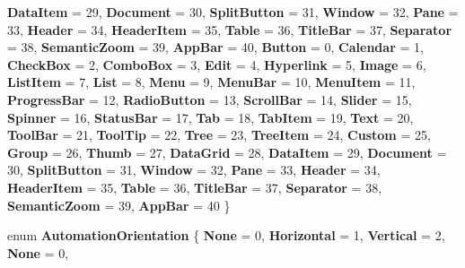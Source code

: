 \begin{DoxyCompactItemize}
{\bfseries Data\+Item} = 29, 
{\bfseries Document} = 30, 
{\bfseries Split\+Button} = 31, 
{\bfseries Window} = 32, 
\newline
{\bfseries Pane} = 33, 
{\bfseries Header} = 34, 
{\bfseries Header\+Item} = 35, 
{\bfseries Table} = 36, 
\newline
{\bfseries Title\+Bar} = 37, 
{\bfseries Separator} = 38, 
{\bfseries Semantic\+Zoom} = 39, 
{\bfseries App\+Bar} = 40, 
\newline
{\bfseries Button} = 0, 
{\bfseries Calendar} = 1, 
{\bfseries Check\+Box} = 2, 
{\bfseries Combo\+Box} = 3, 
\newline
{\bfseries Edit} = 4, 
{\bfseries Hyperlink} = 5, 
{\bfseries Image} = 6, 
{\bfseries List\+Item} = 7, 
\newline
{\bfseries List} = 8, 
{\bfseries Menu} = 9, 
{\bfseries Menu\+Bar} = 10, 
{\bfseries Menu\+Item} = 11, 
\newline
{\bfseries Progress\+Bar} = 12, 
{\bfseries Radio\+Button} = 13, 
{\bfseries Scroll\+Bar} = 14, 
{\bfseries Slider} = 15, 
\newline
{\bfseries Spinner} = 16, 
{\bfseries Status\+Bar} = 17, 
{\bfseries Tab} = 18, 
{\bfseries Tab\+Item} = 19, 
\newline
{\bfseries Text} = 20, 
{\bfseries Tool\+Bar} = 21, 
{\bfseries Tool\+Tip} = 22, 
{\bfseries Tree} = 23, 
\newline
{\bfseries Tree\+Item} = 24, 
{\bfseries Custom} = 25, 
{\bfseries Group} = 26, 
{\bfseries Thumb} = 27, 
\newline
{\bfseries Data\+Grid} = 28, 
{\bfseries Data\+Item} = 29, 
{\bfseries Document} = 30, 
{\bfseries Split\+Button} = 31, 
\newline
{\bfseries Window} = 32, 
{\bfseries Pane} = 33, 
{\bfseries Header} = 34, 
{\bfseries Header\+Item} = 35, 
\newline
{\bfseries Table} = 36, 
{\bfseries Title\+Bar} = 37, 
{\bfseries Separator} = 38, 
{\bfseries Semantic\+Zoom} = 39, 
\newline
{\bfseries App\+Bar} = 40
 \}
\item 
\mbox{\label{namespace_windows_1_1_u_i_1_1_xaml_1_1_automation_1_1_peers_a7279523ced8212af46486c324a89ee2b}} 
enum {\bfseries Automation\+Orientation} \{ \newline
{\bfseries None} = 0, 
{\bfseries Horizontal} = 1, 
{\bfseries Vertical} = 2, 
{\bfseries None} = 0, 
\newline

\end{DoxyCompactItemize}
